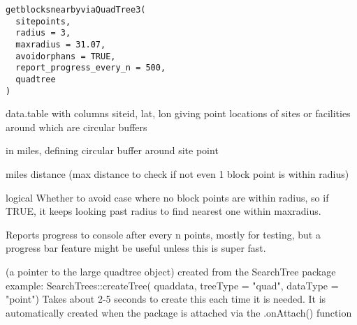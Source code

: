 \documentclass[a4paper]{book}
\begin{document}
%
\begin{Usage}
\begin{verbatim}
getblocksnearbyviaQuadTree3(
  sitepoints,
  radius = 3,
  maxradius = 31.07,
  avoidorphans = TRUE,
  report_progress_every_n = 500,
  quadtree
)
\end{verbatim}
\end{Usage}
%
\begin{Arguments}
\begin{ldescription}
\item[\code{sitepoints}] data.table with columns siteid, lat, lon giving point locations of sites or facilities around which are circular buffers

\item[\code{radius}] in miles, defining circular buffer around site point

\item[\code{maxradius}] miles distance (max distance to check if not even 1 block point is within radius)

\item[\code{avoidorphans}] logical Whether to avoid case where no block points are within radius,
so if TRUE, it keeps looking past radius to find nearest one within maxradius.

\item[\code{report\_progress\_every\_n}] Reports progress to console after every n points,
mostly for testing, but a progress bar feature might be useful unless this is super fast.

\item[\code{quadtree}] (a pointer to the large quadtree object)
created from the SearchTree package example:
SearchTrees::createTree( quaddata, treeType = "quad", dataType = "point")
Takes about 2-5 seconds to create this each time it is needed.
It is automatically created when the package is attached via the .onAttach() function
\end{ldescription}
\end{Arguments}
%
\begin{SeeAlso}\relax
{}    
\end{SeeAlso}
\end{document}
